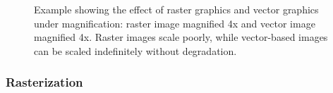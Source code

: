 \documentclass[]{usiinfbachelorproject}
\begin{document}
\begin{figure}[ht]
	\centering
	\caption{Example showing the effect of raster graphics and vector graphics under magnification:  raster image magnified 4x and  vector image magnified 4x. Raster images scale poorly, while vector-based images can be scaled indefinitely without degradation.}
	\label{fig:shark}
\end{figure}

\subsubsection{Rasterization} \label{sec:rasterization}
\end{document}
